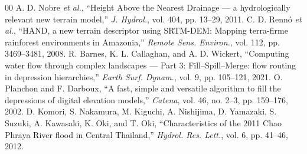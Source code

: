 \documentclass[conference]{IEEEtran}
\begin{document}
\begin{thebibliography}{00}
 A. D. Nobre \emph{et al.}, ``Height Above the Nearest Drainage --- a hydrologically relevant new terrain model,'' \emph{J. Hydrol.}, vol. 404, pp. 13--29, 2011.
 C. D. Renn\'o \emph{et al.}, ``HAND, a new terrain descriptor using SRTM-DEM: Mapping terra-firme rainforest environments in Amazonia,'' \emph{Remote Sens. Environ.}, vol. 112, pp. 3469--3481, 2008.
 R. Barnes, K. L. Callaghan, and A. D. Wickert, ``Computing water flow through complex landscapes --- Part 3: Fill--Spill--Merge: flow routing in depression hierarchies,'' \emph{Earth Surf. Dynam.}, vol. 9, pp. 105--121, 2021.
 O. Planchon and F. Darboux, ``A fast, simple and versatile algorithm to fill the depressions of digital elevation models,'' \emph{Catena}, vol. 46, no. 2--3, pp. 159--176, 2002.
 D. Komori, S. Nakamura, M. Kiguchi, A. Nishijima, D. Yamazaki, S. Suzuki, A. Kawasaki, K. Oki, and T. Oki, ``Characteristics of the 2011 Chao Phraya River flood in Central Thailand,'' \emph{Hydrol. Res. Lett.}, vol. 6, pp. 41--46, 2012.
\end{thebibliography}
\end{document}
